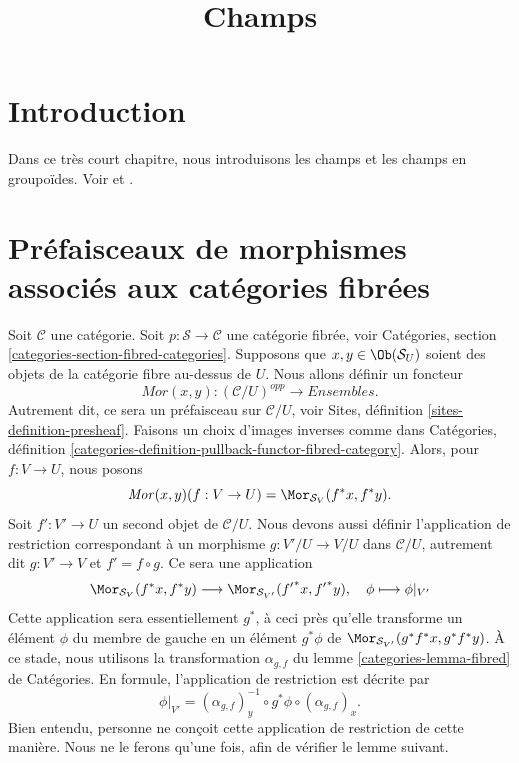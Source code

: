 

%


\title{Champs}


\maketitle

\label{section-phantom}

\tableofcontents

\section{Introduction}
\label{section-introduction}

\noindent
Dans ce très court chapitre, nous introduisons les champs et les
champs en groupoïdes. Voir \cite{DM} et \cite{Vis2}.


\section{Préfaisceaux de morphismes associés aux catégories fibrées}
\label{section-morphisms}

\noindent
Soit $\mathcal{C}$ une catégorie.
Soit $p : \mathcal{S} \to \mathcal{C}$ une catégorie fibrée,
voir Catégories, section \ref{categories-section-fibred-categories}.
Supposons que $x, y\in \Ob(\mathcal{S}_U)$ soient des
objets de la catégorie fibre au-dessus de $U$. Nous allons définir
un foncteur
$$
\mathit{Mor}(x, y) : (\mathcal{C}/U)^{opp} \longrightarrow \textit{Ensembles}.
$$
Autrement dit, ce sera un préfaisceau sur $\mathcal{C}/U$, voir
Sites, définition \ref{sites-definition-presheaf}.
Faisons un choix d'images inverses comme dans
Catégories,
définition \ref{categories-definition-pullback-functor-fibred-category}.
Alors, pour $f : V \to U$, nous posons
$$
\mathit{Mor}(x, y)(f : V \to U) =
\Mor_{\mathcal{S}_V}(f^\ast x, f^\ast y).
$$
Soit $f' : V' \to U$ un second objet de $\mathcal{C}/U$.
Nous devons aussi définir l'application de restriction correspondant à un
morphisme $g : V'/U  \to V/U$ dans $\mathcal{C}/U$,
autrement dit $g : V' \to V$ et $f' = f \circ g$.
Ce sera une application
$$
\Mor_{\mathcal{S}_V}(f^\ast x, f^\ast y)
\longrightarrow
\Mor_{\mathcal{S}_{V'}}({f'}^\ast x, {f'}^\ast y), \quad
\phi \longmapsto \phi|_{V'}
$$
Cette application sera essentiellement $g^\ast$, à ceci près qu'elle transforme
un élément $\phi$ du membre de gauche en un élément
$g^\ast \phi$
de $\Mor_{\mathcal{S}_{V'}}(g^\ast f^\ast x, g^\ast f^\ast y)$.
À ce stade, nous utilisons la transformation $\alpha_{g, f}$ du
lemme \ref{categories-lemma-fibred} de Catégories.
En formule, l'application de restriction est décrite par
$$
\phi|_{V'} =
(\alpha_{g, f})_y^{-1} \circ
g^\ast \phi \circ
(\alpha_{g, f})_x.
$$
Bien entendu, personne ne conçoit cette application de restriction de cette
manière. Nous ne le ferons qu'une fois, afin de vérifier le lemme suivant.

